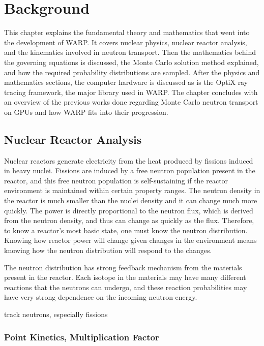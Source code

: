 \chapter{Background}
\label{chap:background}

This chapter explains the fundamental theory and mathematics that went into the development of WARP.  It covers nuclear physics, nuclear reactor analysis, and the kinematics involved in neutron transport.  Then the mathematics behind the governing equations is discussed, the Monte Carlo solution method explained, and how the required probability distributions are sampled.  After the physics and mathematics sections, the computer hardware is discussed as is the OptiX ray tracing framework, the major library used in WARP.  The chapter concludes with an overview of the previous works done regarding Monte Carlo neutron transport on GPUs and how WARP fits into their progression.

\section{Nuclear Reactor Analysis}

Nuclear reactors generate electricity from the heat produced by fissions induced in heavy nuclei.  Fissions are induced by a free neutron population present in the reactor, and this free neutron population is self-sustaining if the reactor environment is maintained within certain property ranges.  The neutron density in the reactor is much smaller than the nuclei density and it can change much more quickly.  The power is directly proportional to the neutron flux, which is derived from the neutron density, and thus can change as quickly as the flux.  Therefore, to know a reactor's most basic state, one must know the neutron distribution.  Knowing how reactor power will change given changes in the environment means knowing how the neutron distribution will respond to the changes.

The neutron distribution has strong feedback mechanism from the materials present in the reactor.  Each isotope in the materials may have many different reactions that the neutrons can undergo, and these reaction probabilities may have very strong dependence on the incoming neutron energy.

track neutrons, especially fissions


\subsection{Point Kinetics, Multiplication Factor}

